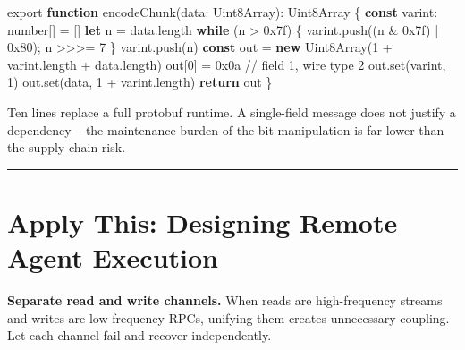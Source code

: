 \documentclass[
  english,
  11pt,
  letterpaper,
]{book}
\newenvironment{Shaded}{\begin{snugshade}}{\end{snugshade}}
\newcommand{\AttributeTok}[1]{\textcolor[rgb]{0.40,0.45,0.13}{#1}}
\newcommand{\BaseNTok}[1]{\textcolor[rgb]{0.68,0.00,0.00}{#1}}
\newcommand{\BuiltInTok}[1]{\textcolor[rgb]{0.00,0.23,0.31}{#1}}
\newcommand{\CommentTok}[1]{\textcolor[rgb]{0.37,0.37,0.37}{#1}}
\newcommand{\ControlFlowTok}[1]{\textcolor[rgb]{0.00,0.23,0.31}{\textbf{#1}}}
\newcommand{\DataTypeTok}[1]{\textcolor[rgb]{0.68,0.00,0.00}{#1}}
\newcommand{\DecValTok}[1]{\textcolor[rgb]{0.68,0.00,0.00}{#1}}
\newcommand{\FunctionTok}[1]{\textcolor[rgb]{0.28,0.35,0.67}{#1}}
\newcommand{\ImportTok}[1]{\textcolor[rgb]{0.00,0.46,0.62}{#1}}
\newcommand{\KeywordTok}[1]{\textcolor[rgb]{0.00,0.23,0.31}{\textbf{#1}}}
\newcommand{\NormalTok}[1]{\textcolor[rgb]{0.00,0.23,0.31}{#1}}
\newcommand{\OperatorTok}[1]{\textcolor[rgb]{0.37,0.37,0.37}{#1}}
\begin{document}
\begin{Shaded}
\begin{Highlighting}[]
\ImportTok{export} \KeywordTok{function} \FunctionTok{encodeChunk}\NormalTok{(data}\OperatorTok{:} \BuiltInTok{Uint8Array}\NormalTok{)}\OperatorTok{:} \BuiltInTok{Uint8Array}\NormalTok{ \{}
  \KeywordTok{const}\NormalTok{ varint}\OperatorTok{:} \DataTypeTok{number}\NormalTok{[] }\OperatorTok{=}\NormalTok{ []}
  \KeywordTok{let}\NormalTok{ n }\OperatorTok{=}\NormalTok{ data}\OperatorTok{.}\AttributeTok{length}
  \ControlFlowTok{while}\NormalTok{ (n }\OperatorTok{\textgreater{}} \BaseNTok{0x7f}\NormalTok{) \{ varint}\OperatorTok{.}\FunctionTok{push}\NormalTok{((n }\OperatorTok{\&} \BaseNTok{0x7f}\NormalTok{) }\OperatorTok{|} \BaseNTok{0x80}\NormalTok{)}\OperatorTok{;}\NormalTok{ n }\OperatorTok{\textgreater{}\textgreater{}\textgreater{}=} \DecValTok{7}\NormalTok{ \}}
\NormalTok{  varint}\OperatorTok{.}\FunctionTok{push}\NormalTok{(n)}
  \KeywordTok{const}\NormalTok{ out }\OperatorTok{=} \KeywordTok{new} \BuiltInTok{Uint8Array}\NormalTok{(}\DecValTok{1} \OperatorTok{+}\NormalTok{ varint}\OperatorTok{.}\AttributeTok{length} \OperatorTok{+}\NormalTok{ data}\OperatorTok{.}\AttributeTok{length}\NormalTok{)}
\NormalTok{  out[}\DecValTok{0}\NormalTok{] }\OperatorTok{=} \BaseNTok{0x0a}  \CommentTok{// field 1, wire type 2}
\NormalTok{  out}\OperatorTok{.}\FunctionTok{set}\NormalTok{(varint}\OperatorTok{,} \DecValTok{1}\NormalTok{)}
\NormalTok{  out}\OperatorTok{.}\FunctionTok{set}\NormalTok{(data}\OperatorTok{,} \DecValTok{1} \OperatorTok{+}\NormalTok{ varint}\OperatorTok{.}\AttributeTok{length}\NormalTok{)}
  \ControlFlowTok{return}\NormalTok{ out}
\NormalTok{\}}
\end{Highlighting}
\end{Shaded}

Ten lines replace a full protobuf runtime. A single-field message does
not justify a dependency -- the maintenance burden of the bit
manipulation is far lower than the supply chain risk.

\begin{center}\rule{0.5\linewidth}{0.5pt}\end{center}

\section{Apply This: Designing Remote Agent
Execution}\label{apply-this-designing-remote-agent-execution}

\textbf{Separate read and write channels.} When reads are high-frequency
streams and writes are low-frequency RPCs, unifying them creates
unnecessary coupling. Let each channel fail and recover independently.
\end{document}
